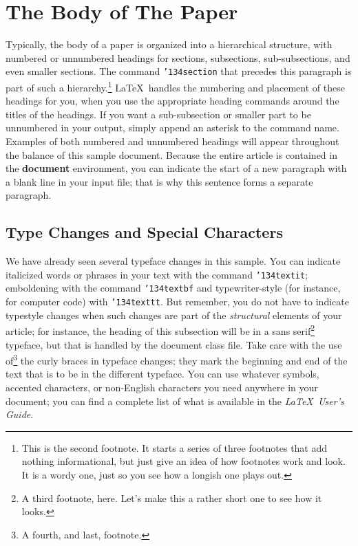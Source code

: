 \documentclass{sig-alternate-05-2015}
\begin{document}
\section{The {\secit Body} of The Paper}
Typically, the body of a paper is organized into a hierarchical structure, with numbered or unnumbered headings for sections, subsections, sub-subsections, and even smaller sections.  The command \texttt{{\char'134}section} that precedes this paragraph is part of such a hierarchy.\footnote{This is the second footnote.  It starts a series of three footnotes that add nothing informational, but just give an idea of how footnotes work and look. It is a wordy one, just so you see how a longish one plays out.} \LaTeX\ handles the numbering and placement of these headings for you, when you use the appropriate heading commands around the titles of the headings.  If you want a sub-subsection or smaller part to be unnumbered in your output, simply append an asterisk to the command name.  Examples of both numbered and unnumbered headings will appear throughout the balance of this sample document.
Because the entire article is contained in the \textbf{document} environment, you can indicate the start of a new paragraph with a blank line in your input file; that is why this sentence forms a separate paragraph.

\subsection{Type Changes and {\subsecit Special} Characters}
We have already seen several typeface changes in this sample. You can indicate italicized words or phrases in your text with the command \texttt{{\char'134}textit}; emboldening with the command \texttt{{\char'134}textbf} and typewriter-style (for instance, for computer code) with \texttt{{\char'134}texttt}.  But remember, you do not have to indicate typestyle changes when such changes are part of the \textit{structural} elements of your article; for instance, the heading of this subsection will be in a sans serif\footnote{A third footnote, here. Let's make this a rather short one to see how it looks.} typeface, but that is handled by the document class file. Take care with the use of\footnote{A fourth, and last, footnote.}  the curly braces in typeface changes; they mark the beginning and end of the text that is to be in the different typeface.
You can use whatever symbols, accented characters, or non-English characters you need anywhere in your document; you can find a complete list of what is available in the \textit{\LaTeX\ User's Guide}\cite{Lamport:LaTeX}.
\end{document}
